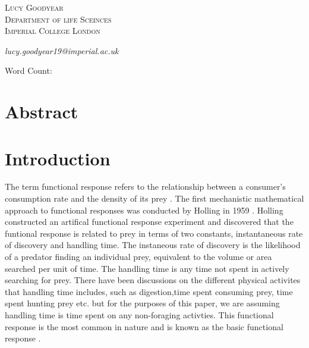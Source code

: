 \documentclass[11pt, a4paper, titlepage]{article}
\begin{document}
\begin{titlepage}
	
	
	
	\vspace{0.5\baselineskip} %
	
	{\scshape\Large Lucy Goodyear\\
		Department of life Sceinces \\
		Imperial College London\\} %
	
	\textit{lucy.goodyear19@imperial.ac.uk}
	\date{}
	
	\vspace*{3\baselineskip} %
	
	Word Count:
	
\end{titlepage}
	
\section*{Abstract}

\newpage

\linenumbers
\section{Introduction}
The term functional response refers to the relationship between a consumer's consumption rate and the density of its prey \parencite{Solomon1949}.  The first mechanistic mathematical approach to functional responses was conducted by Holling in 1959 \parencite{Holling1959b}. Holling constructed an artifical functional response experiment and discovered that the funtional response is related to prey in terms of two constants, instantaneous rate of discovery and handling time. The instaneous rate of discovery is the likelihood of a predator finding an individual prey, equivalent to the volume or area searched per unit of time.
The handling time is any time not spent in actively searching for prey. There have been discussions on the different physical activites that handling time includes, such as digestion,time spent consuming prey, time spent hunting prey etc. \parencite{Jeschke2002, Holling1966} but for the purposes of this paper, we are assuming handling time is time spent on any non-foraging activties.
This functional response is the most common in nature and is known as the basic functional response \parencite{Holling1959b}.
\end{document}
